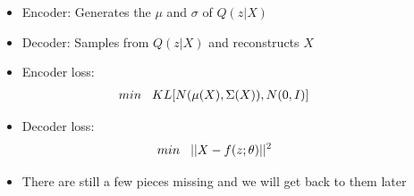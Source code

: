 \documentclass[serif,aspectratio=169,dvipsnames]{beamer}
\begin{document}
\begin{frame}
\begin{columns}
\begin{overlayarea}{\textwidth}{\textheight}
		\end{overlayarea}
		\begin{overlayarea}{\textwidth}{\textheight}
			\begin{itemize}\justifying
				\item<1-> Encoder: Generates the $\mu$ and $\sigma$ of $Q(z|X)$
				\item<2-> Decoder: Samples from $Q(z|X)$ and reconstructs $X$
				\item<3-> Encoder loss: 
				\begin{align*}
				min \hspace{3mm}KL[N(\mu(X), \Sigma(X)), N(0, I)]
				\end{align*}
				\item<4-> Decoder loss: 
				\begin{align*}
				min \hspace{3mm}||X - f(z; \theta)||^2
				\end{align*}
				\item<5-> There are still a few pieces missing and we will get back to them later
			\end{itemize}
		\end{overlayarea}
	\end{columns}
\end{frame}
\end{document}
